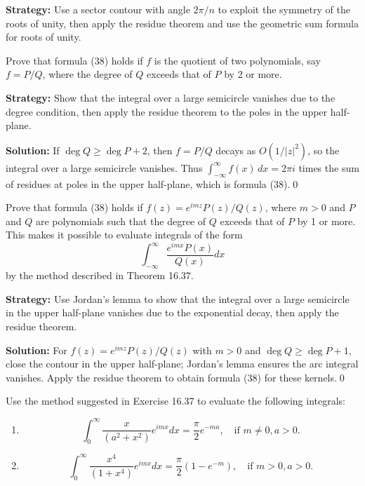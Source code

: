 \noindent\textbf{Strategy:} Use a sector contour with angle \( 2\pi/n \) to exploit the symmetry of the roots of unity, then apply the residue theorem and use the geometric sum formula for roots of unity.


\begin{problembox}
\begin{problemstatement}
Prove that formula (38) holds if \( f \) is the quotient of two polynomials, say \( f = P/Q \), where the degree of \( Q \) exceeds that of \( P \) by 2 or more.
\end{problemstatement}
\end{problembox}

\noindent\textbf{Strategy:} Show that the integral over a large semicircle vanishes due to the degree condition, then apply the residue theorem to the poles in the upper half-plane.

\bigskip\noindent\textbf{Solution:}
If $\deg Q\ge \deg P+2$, then $f=P/Q$ decays as $O(1/|z|^2)$, so the integral over a large semicircle vanishes. Thus $\int_{-\infty}^{\infty} f(x)\,dx=2\pi i$ times the sum of residues at poles in the upper half-plane, which is formula (38).\qed


\begin{problembox}
\begin{problemstatement}
Prove that formula (38) holds if \( f(z) = e^{imz} P(z) / Q(z) \), where \( m > 0 \) and \( P \) and \( Q \) are polynomials such that the degree of \( Q \) exceeds that of \( P \) by 1 or more. This makes it possible to evaluate integrals of the form
\[ \int_{-\infty}^{\infty} \frac{e^{imx} P(x)}{Q(x)} dx \]
by the method described in Theorem 16.37.
\end{problemstatement}
\end{problembox}

\noindent\textbf{Strategy:} Use Jordan's lemma to show that the integral over a large semicircle in the upper half-plane vanishes due to the exponential decay, then apply the residue theorem.

\bigskip\noindent\textbf{Solution:}
For $f(z)=e^{imz}P(z)/Q(z)$ with $m>0$ and $\deg Q\ge \deg P+1$, close the contour in the upper half-plane; Jordan's lemma ensures the arc integral vanishes. Apply the residue theorem to obtain formula (38) for these kernels.\qed


\begin{problembox}
\begin{problemstatement}
Use the method suggested in Exercise 16.37 to evaluate the following integrals:
\begin{enumerate}[label=(\alph*)]
\item \[ \int_0^{\infty} \frac{x}{(a^2 + x^2)} e^{imx} dx = \frac{\pi}{2} e^{-ma}, \quad \text{if } m \neq 0, a > 0. \]
\item \[ \int_0^{\infty} \frac{x^4}{(1 + x^4)} e^{imx} dx = \frac{\pi}{2} (1 - e^{-m}), \quad \text{if } m > 0, a > 0. \]
\end{enumerate}
\end{problemstatement}
\end{problembox}

